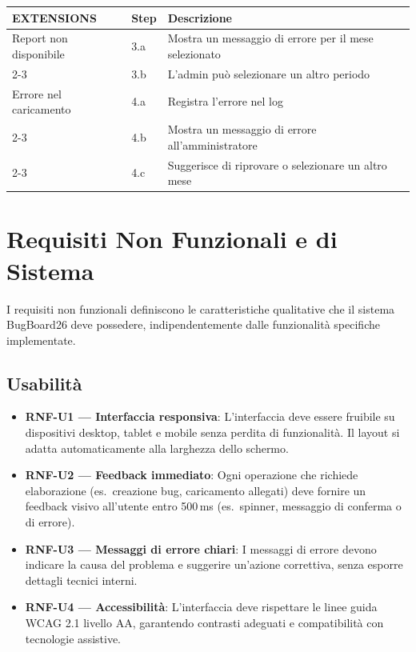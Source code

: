 ﻿\documentclass[a4paper,11pt]{article}
\begin{document}
\vspace{0.5cm}

\begin{tabular}{|p{3cm}|p{1.5cm}|p{9.5cm}|}
\hline
\textbf{EXTENSIONS} & \textbf{Step} & \textbf{Descrizione} \\
\hline
Report non disponibile & 3.a & Mostra un messaggio di errore per il mese selezionato \\
\cline{2-3}
 & 3.b & L'admin pu\`o selezionare un altro periodo \\
\hline
Errore nel caricamento & 4.a & Registra l'errore nel log \\
\cline{2-3}
 & 4.b & Mostra un messaggio di errore all'amministratore \\
\cline{2-3}
 & 4.c & Suggerisce di riprovare o selezionare un altro mese \\
\hline
\end{tabular}

\section{Requisiti Non Funzionali e di Sistema}

I requisiti non funzionali definiscono le caratteristiche qualitative che il sistema BugBoard26 deve possedere, indipendentemente dalle funzionalit\`a specifiche implementate.

\subsection{Usabilit\`a}
\begin{itemize}
  \item \textbf{RNF-U1 --- Interfaccia responsiva}: L'interfaccia deve essere fruibile su dispositivi desktop, tablet e mobile senza perdita di funzionalit\`a. Il layout si adatta automaticamente alla larghezza dello schermo.
  \item \textbf{RNF-U2 --- Feedback immediato}: Ogni operazione che richiede elaborazione (es.\ creazione bug, caricamento allegati) deve fornire un feedback visivo all'utente entro 500\,ms (es.\ spinner, messaggio di conferma o di errore).
  \item \textbf{RNF-U3 --- Messaggi di errore chiari}: I messaggi di errore devono indicare la causa del problema e suggerire un'azione correttiva, senza esporre dettagli tecnici interni.
  \item \textbf{RNF-U4 --- Accessibilit\`a}: L'interfaccia deve rispettare le linee guida WCAG 2.1 livello AA, garantendo contrasti adeguati e compatibilit\`a con tecnologie assistive.
\end{itemize}
\end{document}
